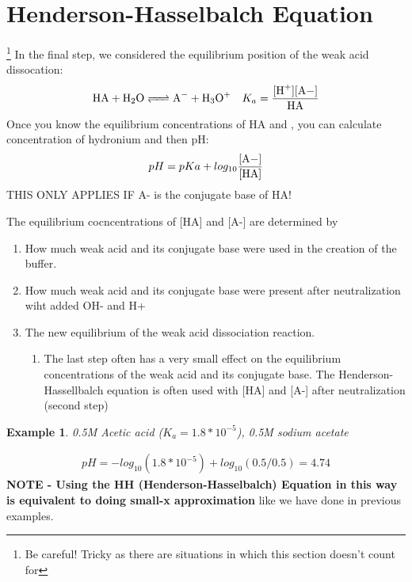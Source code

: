 \documentclass{article}  %
\newtheorem{exmp}{Example}
\begin{document}
\section*{Henderson-Hasselbalch Equation}\footnote{Be careful! Tricky as there are situations in which this section doesn't count for}
In the final step, we considered the equilibrium position of the weak acid dissocation:
\begin{equation*}
    \begin{aligned}
        \ce{HA + H2O <=> A- + H3O+} \quad K_a = \ce{\frac{[H+][A-]}{HA}} 
    \end{aligned}
\end{equation*}
Once you know the equilibrium concentrations of HA and , you can calculate concentration of hydronium and then pH:
\begin{equation*}
    \begin{aligned}
        pH = pKa + log_{10}\ce{\frac{[A-]}{[HA]}}
    \end{aligned}
\end{equation*}
THIS ONLY APPLIES IF A- is the conjugate base of HA!

The equilibrium cocncentrations of [HA] and [A-] are determined by 
\begin{enumerate}
    \item How much weak acid and its conjugate base were used in the creation of the buffer.
    \item How much weak acid and its conjugate base were present after neutralization wiht added OH- and H+
    \item The new equilibrium of the weak acid dissociation reaction.
    \begin{enumerate}
        \item The last step often has a very small effect on the equilibrium concentrations of the weak acid and its conjugate base. The Henderson-Hassellbalch equation is often used with [HA] and [A-] after neutralization (second step) 
    \end{enumerate}
\end{enumerate}
\begin{exmp}
    0.5M Acetic acid ($K_a = 1.8*10^{-5}$), 0.5M sodium acetate
\end{exmp}
\begin{equation*}
    \begin{aligned}
        pH = -log_{10}(1.8*10^{-5}) + log_{10}(0.5/0.5) = 4.74
    \end{aligned}
\end{equation*}
\textbf{NOTE - Using the HH (Henderson-Hasselbalch) Equation in this way is equivalent to doing small-x approximation} like we have done in previous examples.
\end{document}
